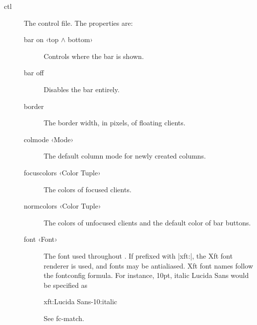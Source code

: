 \begin{description}
  \item[ctl] The control file. The properties are:
    \begin{description}
      \item[bar on ‹top $\wedge$ bottom›] Controls where the bar
        is shown.
      \item[bar off] Disables the bar entirely.
      \item[border] The border width, in pixels, of floating
        clients.
      \item[colmode ‹Mode›] The default column mode for newly
        created columns.
      \item[focuscolors ‹Color Tuple›] The colors of focused
        clients.
      \item[normcolors ‹Color Tuple›] The colors of unfocused
        clients and the default color of bar buttons.
      \item[font ‹Font›] The font used throughout \wmii. If
        prefixed with |xft:|, the Xft font renderer is used, and
        fonts may be antialiased. Xft font names follow the
        fontconfig formula. For instance, 10pt, italic Lucida
        Sans would be specified as

        \begin{code}
          xft:Lucida Sans-10:italic
        \end{code}

        See  {fc-match}.


\end{description}
\end{description}
